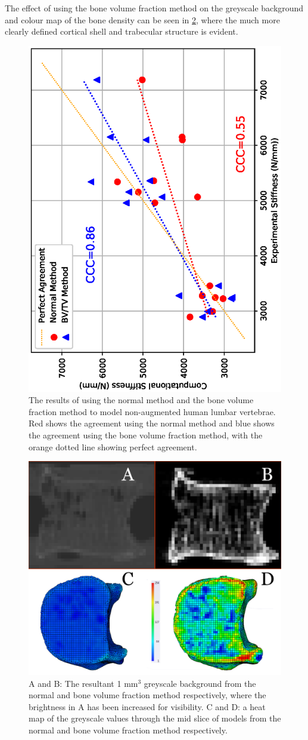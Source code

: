 The effect of using the bone volume fraction method on the greyscale background
and colour map of the bone density can be seen in \cref{fig:compX4}, where the
much more clearly defined cortical shell and trabecular structure is evident.

\begin{figure}[h!]
  \centering
  \includegraphics[width=.65\textwidth, angle=270]{Chapters/Chapter_HT_images/intact_norm_bvtv}
	\caption{The results of using the normal method and the bone volume
	fraction method to model non-augmented human lumbar vertebrae. Red
shows the agreement using the normal method and blue shows the agreement using
the bone volume fraction method, with the orange dotted line showing perfect
agreement.}
	\label{fig:intact_norm_bvtv}
\end{figure}


\begin{figure}[h!]
  \centering
\includegraphics[width=.65\textwidth]{Chapters/Chapter_HT_images/compX4MethodAvsB.png}
\caption{A and B: The resultant 1 mm$^3$ greyscale background from the normal
and bone volume fraction method respectively, where the brightness in A has
been increased for visibility. C and D: a heat map of the greyscale values
through the mid slice of models from the normal and bone volume fraction method
respectively.}
	\label{fig:compX4}
\end{figure}

